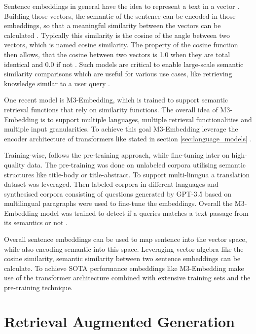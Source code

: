 \documentclass[a4paper,oneside,bibliography=totoc]{scrbook}
\begin{document}
Sentence embeddings in general have the idea to represent a text in a vector \cite{Singhal2001}. Building those vectors, the semantic of the sentence can be encoded in those embeddings, so that a meaningful similarity between the vectors can be calculated \cite{Reimers2019}. Typically this similarity is the cosine of the angle between two vectors, which is named cosine similarity. The property of the cosine function then allows, that the cosine between two vectors is 1.0 when they are total identical and 0.0 if not \cite{Singhal2001}. Such models are critical to enable large-scale semantic similarity comparisons which are useful for various use cases, like retrieving knowledge similar to a user query \cite{Reimers2019,Gao2024}.

One recent model is M3-Embedding, which is trained to support semantic retrieval functions that rely on similarity functions. The overall idea of M3-Embedding is to support multiple languages, multiple retrieval functionalities and multiple input granularities. To achieve this goal M3-Embedding leverage the encoder architecture of transformers like stated in section \ref{sec:language_models} \cite{Chen2024}.

Training-wise, \citet{Chen2024} follows the pre-training approach, while fine-tuning later on high-quality data. The pre-training was done on unlabeled corpora utilising semantic structures like title-body or title-abstract. To support multi-linugua a translation dataset was leveraged. Then labeled corpora in different languages and synthesised corpora consisting of questions generated by \ac{GPT}-3.5 based on multilingual paragraphs were used to fine-tune the embeddings. Overall the M3-Embedding model was trained to detect if a queries matches a text passage from its semantics or not \cite{Chen2024}.

Overall sentence embeddings can be used to map sentence into the vector space, while also encoding semantic into this space. Leveraging vector algebra like the cosine similarity, semantic similarity between two sentence embeddings can be calculate. To achieve SOTA performance embeddings like M3-Embedding make use of the transformer architecture combined with extensive training sets and the pre-training technique.

\section{Retrieval Augmented Generation}
\label{sec:retrieval_augmented_generation}
\end{document}
